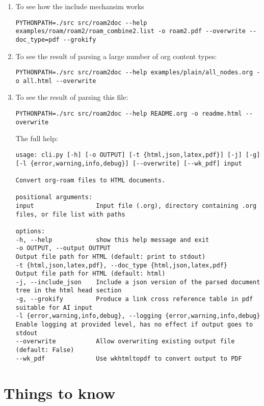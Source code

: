 \documentclass[11pt]{article}
\begin{document}
\begin{enumerate}
\begin{enumerate}
\begin{verbatim}
\end{verbatim}
\item
To see how the include mechansim works
\begin{verbatim}
PYTHONPATH=./src src/roam2doc --help examples/roam/roam2/roam_combine2.list -o roam2.pdf --overwrite --doc_type=pdf --grokify
\end{verbatim}
\item
To see the result of parsing a large number of org content types:
\begin{verbatim}
PYTHONPATH=./src src/roam2doc --help examples/plain/all_nodes.org -o all.html --overwrite    
\end{verbatim}
\item
To see the result of parsing this file:
\begin{verbatim}
PYTHONPATH=./src src/roam2doc --help README.org -o readme.html --overwrite    
\end{verbatim}
The full help:

\begin{verbatim}
usage: cli.py [-h] [-o OUTPUT] [-t {html,json,latex,pdf}] [-j] [-g] [-l {error,warning,info,debug}] [--overwrite] [--wk_pdf] input

Convert org-roam files to HTML documents.

positional arguments:
input                 Input file (.org), directory containing .org files, or file list with paths

options:
-h, --help            show this help message and exit
-o OUTPUT, --output OUTPUT
Output file path for HTML (default: print to stdout)
-t {html,json,latex,pdf}, --doc_type {html,json,latex,pdf}
Output file path for HTML (default: html)
-j, --include_json    Include a json version of the parsed document tree in the html head section
-g, --grokify         Produce a link cross reference table in pdf suitable for AI input
-l {error,warning,info,debug}, --logging {error,warning,info,debug}
Enable logging at provided level, has no effect if output goes to stdout
--overwrite           Allow overwriting existing output file (default: False)
--wk_pdf              Use wkhtmltopdf to convert output to PDF

\end{verbatim}
\vspace{\baselineskip}
\end{enumerate}
\end{enumerate}
\section{Things to know  }
 \label{obj-103}
 \label{obj-102}
\vspace{\baselineskip}
\end{document}
